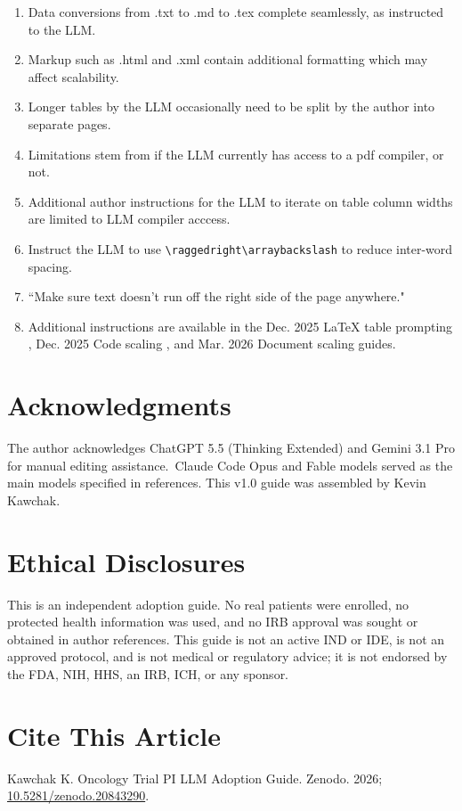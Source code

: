 \documentclass{article}
\begin{document}
\begin{enumerate}
\begin{enumerate}
    \item Data conversions from .txt to .md to .tex complete seamlessly, as instructed to the LLM.
    \item Markup such as .html and .xml contain additional formatting which may affect scalability. 
    \item Longer tables by the LLM occasionally need to be split by the author into separate pages.
    \item Limitations stem from if the LLM currently has access to a pdf compiler, or not. \item Additional author instructions for the LLM to iterate on table column widths are limited to LLM compiler acccess. 
    \item Instruct the LLM to use \texttt{\textbackslash raggedright\textbackslash arraybackslash} to reduce inter-word spacing.
    \item “Make sure text doesn't run off the right side of the page anywhere." 
    \item Additional instructions are available in the Dec. 2025 LaTeX table prompting \cite{LLMTablePrompt}, Dec. 2025 Code scaling \cite{AIGenCode}, and Mar. 2026 Document scaling guides. \cite{PresentCode}
\end{enumerate}
\end{enumerate}
 

\clearpage 





 
\section{Acknowledgments}
The author acknowledges ChatGPT 5.5 (Thinking Extended) and Gemini 3.1 Pro for manual editing assistance.\ Claude Code Opus and Fable models served as the main models specified in references. This v1.0 guide was assembled by Kevin Kawchak. 


\section{Ethical Disclosures}
This is an independent adoption guide. No real patients were enrolled, no protected
health information was used, and no IRB approval was sought or obtained in author references. This guide is not an active IND
or IDE, is not an approved protocol, and is not medical or regulatory advice; it is not endorsed by the FDA, NIH, HHS, an IRB, ICH, or any sponsor.


\section{Cite This Article}
Kawchak K. Oncology Trial PI LLM Adoption Guide. Zenodo.
2026; \href{https://doi.org/10.5281/zenodo.20843290}{10.5281/zenodo.20843290}.
\end{document}
